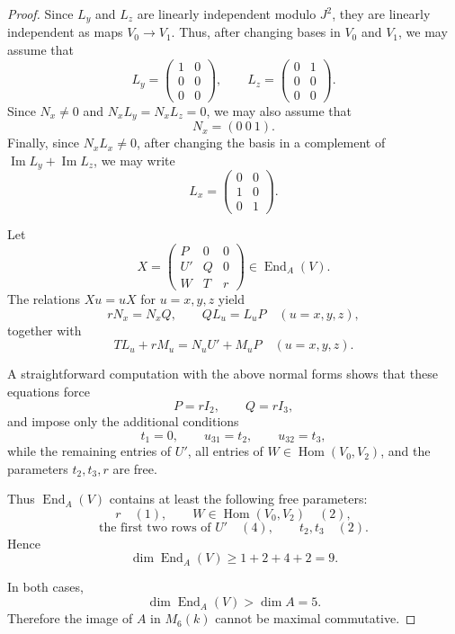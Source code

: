 \documentclass[10pt,a4paper]{amsart}
\DeclareMathOperator{\End}{End}
\DeclareMathOperator{\Hom}{Hom}
\begin{document}
\begin{proof}
	Since $L_y$ and $L_z$ are linearly independent modulo $J^2$, they are linearly independent as maps
	$V_0\to V_1$. Thus, after changing bases in $V_0$ and $V_1$, we may assume that
	\[
	L_y=
	\begin{pmatrix}
		1&0\\
		0&0\\
		0&0
	\end{pmatrix},
	\qquad
	L_z=
	\begin{pmatrix}
		0&1\\
		0&0\\
		0&0
	\end{pmatrix}.
	\]
	Since $N_x\neq 0$ and $N_xL_y=N_xL_z=0$, we may also assume that
	\[
	N_x=(0\ 0\ 1).
	\]
	Finally, since $N_xL_x\neq 0$, after changing the basis in a complement of
	$\operatorname{Im}L_y+\operatorname{Im}L_z$, we may write
	\[
	L_x=
	\begin{pmatrix}
		0&0\\
		1&0\\
		0&1
	\end{pmatrix}.
	\]
	
	Let
	\[
	X=
	\begin{pmatrix}
		P&0&0\\
		U'&Q&0\\
		W&T&r
	\end{pmatrix}\in \End_A(V).
	\]
	The relations $Xu=uX$ for $u=x,y,z$ yield
	\[
	rN_x=N_xQ,\qquad QL_u=L_uP\quad (u=x,y,z),
	\]
	together with
	\[
	TL_u+rM_u=N_uU'+M_uP\quad (u=x,y,z).
	\]
	
	A straightforward computation with the above normal forms shows that these equations force
	\[
	P=rI_2,\qquad Q=rI_3,
	\]
	and impose only the additional conditions
	\[
	t_1=0,\qquad u_{31}=t_2,\qquad u_{32}=t_3,
	\]
	while the remaining entries of $U'$, all entries of $W\in\Hom(V_0,V_2)$, and the parameters
	$t_2,t_3,r$ are free.
	
	Thus $\End_A(V)$ contains at least the following free parameters:
	\[
	r \quad (1),\qquad W\in \Hom(V_0,V_2)\quad (2),
	\]
	\[
	\text{the first two rows of }U' \quad (4),\qquad t_2,t_3 \quad (2).
	\]
	Hence
	\[
	\dim\End_A(V)\ge 1+2+4+2=9.
	\]
	
	In both cases,
	\[
	\dim\End_A(V)>\dim A=5.
	\]
	Therefore the image of $A$ in $M_6(k)$ cannot be maximal commutative.
\end{proof}
\end{document}
